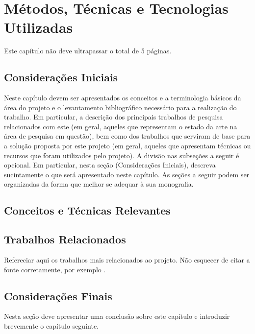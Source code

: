 \chapter{Métodos, Técnicas e Tecnologias Utilizadas}

Este capítulo não deve ultrapassar o total de 5 páginas.

\section{Considerações Iniciais}
Neste capítulo  devem ser apresentados  os conceitos e  a terminologia
básicos da área  do projeto e o  levantamento bibliográfico necessário
para  a  realização  do  trabalho.  Em  particular,  a  descrição  dos
principais  trabalhos de  pesquisa  relacionados com  este (em  geral,
aqueles  que representam  o  estado da  arte na  área  de pesquisa  em
questão), bem como  dos trabalhos que serviram de base  para a solução
proposta por este  projeto (em geral, aqueles  que apresentam técnicas
ou  recursos  que  foram  utilizados  pelo  projeto).  A  divisão  nas
subseções   a  seguir   é  opcional.    Em  particular,   nesta  seção
(Considerações Iniciais), descreva sucintamente o que será apresentado
neste capítulo.  As seções a seguir podem ser organizadas da forma que
melhor se adequar à sua monografia.


\section{Conceitos e Técnicas Relevantes}



\section{Trabalhos Relacionados}
Refereciar  aqui  os  trabalhos  mais  relacionados  ao  projeto.  Não
esquecer de citar a fonte corretamente, por exemplo \cite{silva:12}.


\section{Considerações Finais}
Nesta  seção  deve apresentar  uma  conclusão  sobre este  capítulo  e
introduzir brevemente o capítulo seguinte.
